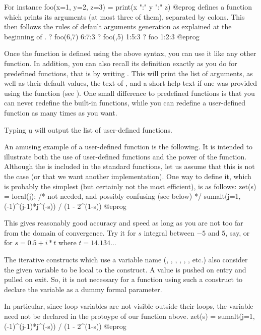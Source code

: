  For instance
\bprog
  foo(x=1, y=2, z=3) = print(x ":" y ":" z)
@eprog
\noindent defines a function which prints its arguments (at most three of
them), separated by colons. This then follows the rules of default
arguments generation as explained at the beginning of
.
\bprog
? foo(6,7)
6:7:3
? foo(,5)
1:5:3
? foo
1:2:3
@eprog

  Once the function is defined using the above syntax, you can use it like
any other function. In addition, you can also recall its definition exactly
as you do for predefined functions, that is by writing .
This will print the list of arguments, as well as their default values,
the text of , and a short help text if one was provided using
the  function (see ). One small difference
to predefined functions is that you can never redefine the built-in
functions, while you can redefine a user-defined function as many times
as you want.

Typing \b{u} will output the list of user-defined functions.

An amusing example of a user-defined function is the following. It is
intended to illustrate both the use of user-defined functions and the power
of the  function. Although the  is
included in the standard functions, let us assume that this is not the case
(or that we want another implementation). One way to define it, which is
probably the simplest (but certainly not the most efficient), is as
follows:
\bprog
zet(s) =
{
  local(j); /* not needed, and possibly confusing (see below) */
  sumalt(j=1, (-1)^(j-1)*j^(-s)) / (1 - 2^(1-s))
}
@eprog

\noindent This gives reasonably good accuracy and speed as long as you are
not too far from the domain of convergence. Try it for $s$ integral between
$-5$ and $5$, say, or for $s=0.5+i*t$ where $t=14.134\dots$

The iterative constructs which use a variable name (,
, , , , ,
etc.) also consider the given variable to be local to the construct. A value
is pushed on entry and pulled on exit. So, it is not necessary for a function
using such a construct to declare the variable as a dummy formal parameter.

In particular, since loop variables are not visible outside their loops,
the variable  need not be declared in the protoype of our 
function above.
\bprog
zet(s) = sumalt(j=1, (-1)^(j-1)*j^(-s)) / (1 - 2^(1-s))
@eprog

